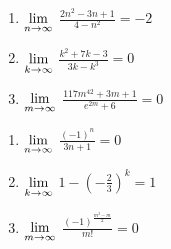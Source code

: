 \begin{multicols}{3}
\begin{enumerate}
\setcounter{enumi}{\value{HW}}

\item  $\displaystyle{\lim_{n \rightarrow \infty}}$ $\frac{2n^2 - 3n+1}{4-n^2} = -2$

\item  $\displaystyle{\lim_{k \rightarrow \infty}}$ $\frac{k^2 +7k-3}{3k - k^3} = 0$

\item\label{limseqexlast}  $\displaystyle{\lim_{m \rightarrow \infty}}$ $\frac{117m^{42} + 3m + 1}{e^{2m} + 6} = 0$

\setcounter{HW}{\value{enumi}}
\end{enumerate}
\end{multicols}

\begin{multicols}{3}
\begin{enumerate}
\setcounter{enumi}{\value{HW}}

\item  $\displaystyle{\lim_{n \rightarrow \infty}}$ $\frac{(-1)^{n}}{3n+1} = 0$

\item  $\displaystyle{\lim_{k \rightarrow \infty}}$ $1 - \left( - \frac{2}{3}  \right)^{k} = 1$

\item  $\displaystyle{\lim_{m \rightarrow \infty}}$ $\frac{(-1)^{ \frac{m^2-m}{2}} }{m!} = 0$

\setcounter{HW}{\value{enumi}}
\end{enumerate}
\end{multicols}



